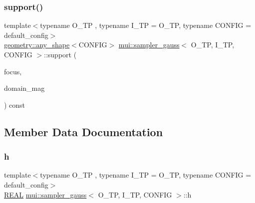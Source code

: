 \mbox{\label{classmui_1_1sampler__gauss_ad25b62e266769f0e60d77ea640a9a4a2}} 
\subsubsection{\texorpdfstring{support()}{support()}}
{\footnotesize\ttfamily template$<$typename O\+\_\+\+TP , typename I\+\_\+\+TP  = O\+\_\+\+TP, typename C\+O\+N\+F\+IG  = default\+\_\+config$>$ \\
\hyperlink{classmui_1_1geometry_1_1any__shape}{geometry\+::any\+\_\+shape}$<$C\+O\+N\+F\+IG$>$ \hyperlink{classmui_1_1sampler__gauss}{mui\+::sampler\+\_\+gauss}$<$ O\+\_\+\+TP, I\+\_\+\+TP, C\+O\+N\+F\+IG $>$\+::support (\begin{DoxyParamCaption}\item[{\hyperlink{classmui_1_1sampler__gauss_aeae4228a569ecea463221e54dade2bcc}{point\+\_\+type}}]{focus,  }\item[{\hyperlink{classmui_1_1sampler__gauss_a35a01ac5eb1f9f41dc5642844a43366b}{R\+E\+AL}}]{domain\+\_\+mag }\end{DoxyParamCaption}) const\hspace{0.3cm}{\ttfamily [inline]}}



\subsection{Member Data Documentation}
\mbox{\label{classmui_1_1sampler__gauss_a2689156737ae9de6e366edaaf4834c2d}} 
\subsubsection{\texorpdfstring{h}{h}}
{\footnotesize\ttfamily template$<$typename O\+\_\+\+TP , typename I\+\_\+\+TP  = O\+\_\+\+TP, typename C\+O\+N\+F\+IG  = default\+\_\+config$>$ \\
\hyperlink{classmui_1_1sampler__gauss_a35a01ac5eb1f9f41dc5642844a43366b}{R\+E\+AL} \hyperlink{classmui_1_1sampler__gauss}{mui\+::sampler\+\_\+gauss}$<$ O\+\_\+\+TP, I\+\_\+\+TP, C\+O\+N\+F\+IG $>$\+::h\hspace{0.3cm}{\ttfamily [protected]}}

